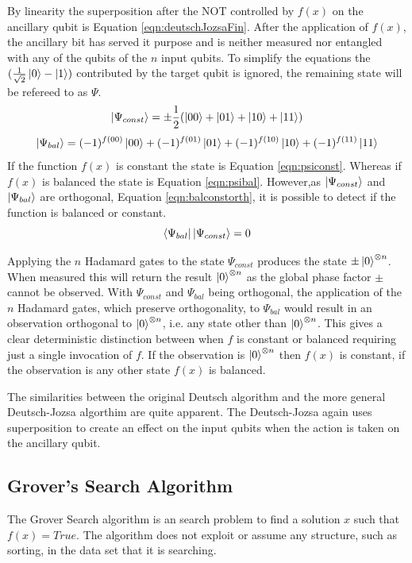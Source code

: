 By linearity the superposition after the NOT controlled by $f(x)$ on the ancillary qubit is Equation \ref{eqn:deutschJozsaFin}.
After the application of $f(x)$, the ancillary bit has served it purpose and is neither measured nor entangled with any of the qubits of the $n$ input qubits.
To simplify the equations the $(\frac{1}{\sqrt{2}}\left\vert{0}\right\rangle-\left\vert{1}\right\rangle)$ contributed by the target qubit is ignored, the remaining state will be refereed to as $\Psi$.
\begin{equation}
\label{eqn:psiconst}
\left\vert{\Psi_{const}}\right\rangle=\pm\frac{1}{2}(\left\vert{00}\right\rangle+\left\vert{01}\right\rangle+\left\vert{10}\right\rangle+\left\vert{11}\right\rangle)
\end{equation}
\begin{equation}
\label{eqn:psibal}
\left\vert{\Psi_{bal}}\right\rangle=(-1)^{f(00)}\left\vert{00}\right\rangle+(-1)^{f(01)}\left\vert{01}\right\rangle+(-1)^{f(10)}\left\vert{10}\right\rangle+(-1)^{f(11)}\left\vert{11}\right\rangle
\end{equation}
If the function $f(x)$ is constant the state is Equation \ref{eqn:psiconst}.
Whereas if $f(x)$ is balanced the state is Equation \ref{eqn:psibal}.
However,as $\left\vert{\Psi_{const}}\right\rangle$ and $\left\vert{\Psi_{bal}}\right\rangle$ are orthogonal, Equation \ref{eqn:balconstorth}, it is possible to detect if the function is balanced or constant.
\begin{equation}
\label{eqn:balconstorth}
\left\langle{\Psi_{bal}}\right\vert\left\vert{\Psi_{const}}\right\rangle=0
\end{equation}

Applying the $n$ Hadamard gates to the state $\Psi_{const}$ produces the state $\pm\left\vert{0}\right\rangle^{\otimes{n}}$.
When measured this will return the result $\left\vert{0}\right\rangle^{\otimes{n}}$ as the global phase factor $\pm$ cannot be observed.
With $\Psi_{const}$ and $\Psi_{bal}$ being orthogonal, the application of the $n$ Hadamard gates, which preserve orthogonality, to $\Psi_{bal}$ would result in an observation orthogonal to $\left\vert{0}\right\rangle^{\otimes{n}}$, i.e. any state other than $\left\vert{0}\right\rangle^{\otimes{n}}$.
This gives a clear deterministic distinction between when $f$ is constant or balanced requiring just a single invocation of $f$.
If the observation is $\left\vert{0}\right\rangle^{\otimes{n}}$ then $f(x)$ is constant, if the observation is any other state $f(x)$ is balanced.

The similarities between the original Deutsch algorithm and the more general Deutsch-Jozsa algorthim are quite apparent.
The Deutsch-Jozsa again uses superposition to create an effect on the input qubits when the action is taken on the ancillary qubit.

\subsection{Grover's Search Algorithm}	
\label{sec:grovers}
The Grover Search algorithm\cite{Grover:1996rk} is an search problem to find a solution $x$ such that $f(x)=True$.
The algorithm does not exploit or assume any structure, such as sorting, in the data set that it is searching.


